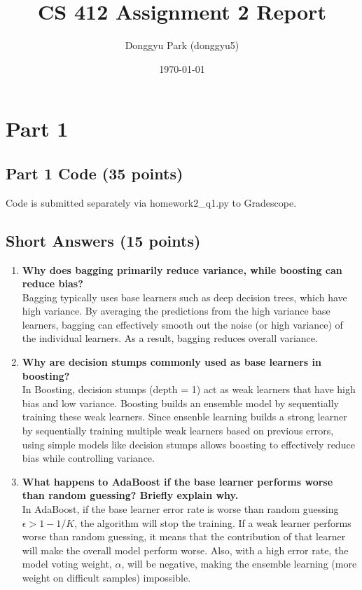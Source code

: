 \documentclass[12pt]{article}
\title{CS 412 Assignment 2 Report}
\author{Donggyu Park (donggyu5)}
\date{\today}
\begin{document}
\maketitle

\section{Part 1}

\subsection{Part 1 Code (35 points)}

Code is submitted separately via homework2\_q1.py to Gradescope.

\subsection{Short Answers (15 points)}

\begin{enumerate}[label=(\alph*)]
    \item \textbf{Why does bagging primarily reduce variance, while boosting can reduce bias?}
    \\%
    Bagging typically uses base learners such as deep decision trees, which have high variance. 
    By averaging the predictions from the high variance base learners, bagging can effectively smooth out
    the noise (or high variance) of the individual learners. As a result, bagging reduces overall variance.

    \item \textbf{Why are decision stumps commonly used as base learners in boosting?}
    \\%
    In Boosting, decision stumps (depth = 1) act as weak learners that have high bias and low variance.
    Boosting builds an ensemble model by sequentially training these weak learners.
    Since ensenble learning builds a strong learner by sequentially training multiple weak learners based on previous errors,
    using simple models like decision stumps allows boosting to effectively reduce bias while controlling variance.

    \item \textbf{What happens to AdaBoost if the base learner performs worse than random guessing? Briefly explain why.}
    \\%
    In AdaBoost, if the base learner error rate is worse than random guessing $\epsilon > 1 - 1/K$, the algorithm will stop the training.
    If a weak learner performs worse than random guessing, it means that the contribution of that learner will make the overall model perform worse.
    Also, with a high error rate, the model voting weight, $\alpha$, will be negative, making the ensemble learning (more weight on difficult samples) impossible.
    
\end{enumerate}
\end{document}

